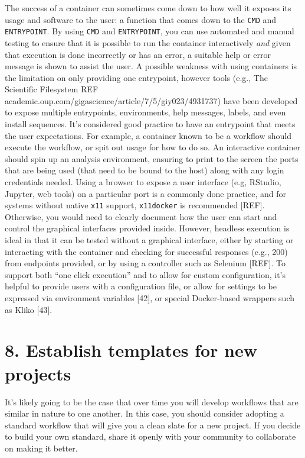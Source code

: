 \documentclass[10pt,letterpaper]{article}
\begin{document}
The success of a container can sometimes come down to how well it
exposes its usage and software to the user: a function that comes down
to the \texttt{CMD} and \texttt{ENTRYPOINT}. By using \texttt{CMD} and
\texttt{ENTRYPOINT}, you can use automated and manual testing to ensure
that it is possible to run the container interactively \emph{and} given
that execution is done incorrectly or has an error, a suitable help or
error message is shown to assist the user. A possible weakness with
using containers is the limitation on only providing one entrypoint,
however tools (e.g., The Scientific Filesystem REF
academic.oup.com/gigascience/article/7/5/giy023/4931737) have been
developed to expose multiple entrypoints, environments, help messages,
labels, and even install sequences. It's considered good practice to
have an entrypoint that meets the user expectations. For example, a
container known to be a workflow should execute the workflow, or spit
out usage for how to do so. An interactive container should spin up an
analysis environment, ensuring to print to the screen the ports that are
being used (that need to be bound to the host) along with any login
credentials needed. Using a browser to expose a user interface (e.g,
RStudio, Jupyter, web tools) on a particular port is a commonly done
practice, and for systems without native \texttt{x11} support,
\texttt{x11docker} is recommended {[}REF{]}. Otherwise, you would need
to clearly document how the user can start and control the graphical
interfaces provided inside. However, headless execution is ideal in that
it can be tested without a graphical interface, either by starting or
interacting with the container and checking for successful responses
(e.g., 200) from endpoints provided, or by using a controller such as
Selenium {[}REF{]}. To support both ``one click execution'' and to allow
for custom configuration, it's helpful to provide users with a
configuration file, or allow for settings to be expressed via
environment variables {[}42{]}, or special Docker-based wrappers such as
Kliko {[}43{]}.

\hypertarget{establish-templates-for-new-projects}{%
\section*{8. Establish templates for new
projects}\label{establish-templates-for-new-projects}}

It's likely going to be the case that over time you will develop
workflows that are similar in nature to one another. In this case, you
should consider adopting a standard workflow that will give you a clean
slate for a new project. If you decide to build your own standard, share
it openly with your community to collaborate on making it better.
\end{document}
